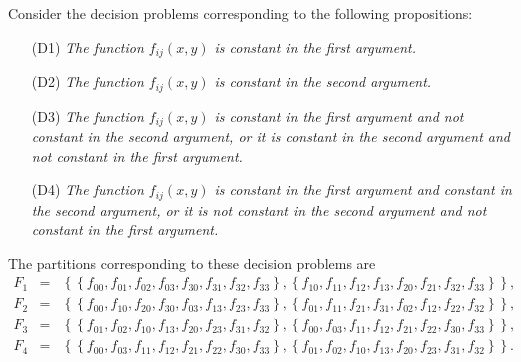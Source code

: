 Consider the decision problems corresponding to the following propositions:
\begin{enumerate}
\item[(D1)]
{\em The function $f_{ij}(x,y)$  is  constant in the first argument.}


\item[(D2)]
{\em The function $f_{ij}(x,y)$  is  constant in the second argument.}


\item[(D3)]
{\em The function $f_{ij}(x,y)$  is  constant in the first argument and not constant in the second argument,
                           or it is  constant in the second argument and not constant in the first argument.}


\item[(D4)]
{\em The function $f_{ij}(x,y)$  is  constant in the first argument and constant in the second argument,
                           or it is  not constant in the second argument and not constant in the first argument.}
\end{enumerate}

The partitions corresponding to these decision problems are
\begin{eqnarray}
F_1&=&
\left\{
\left\{
     f_{ 00} ,
     f_{ 01} ,
     f_{ 02} ,
     f_{ 03} ,
     f_{ 30} ,
     f_{ 31} ,
     f_{ 32} ,
     f_{ 33}
\right\},
\left\{
    f_{  10} ,
     f_{ 11} ,
     f_{ 12} ,
     f_{ 13} ,
     f_{ 20} ,
     f_{ 21} ,
     f_{ 32} ,
     f_{ 33}
\right\}
\right\}
,
\label{2005-ko-e55-01a}   \\
F_2&=&
\left\{
\left\{
     f_{ 00} ,
     f_{ 10} ,
     f_{ 20} ,
     f_{ 30} ,
     f_{ 03} ,
     f_{ 13} ,
     f_{ 23} ,
     f_{ 33}
\right\},
\left\{
     f_{ 01} ,
     f_{ 11} ,
     f_{ 21} ,
     f_{ 31} ,
     f_{ 02} ,
     f_{ 12} ,
     f_{ 22} ,
     f_{ 32}
\right\}
\right\}
,
\label{2005-ko-e55-01b}   \\
F_3&=&
\left\{
\left\{
     f_{ 01} ,
     f_{ 02} ,
     f_{ 10} ,
     f_{ 13} ,
     f_{ 20} ,
     f_{ 23} ,
     f_{ 31} ,
     f_{ 32}
\right\},
\left\{
     f_{ 00} ,
     f_{ 03} ,
     f_{ 11} ,
     f_{ 12} ,
     f_{ 21} ,
     f_{ 22} ,
     f_{ 30} ,
     f_{ 33}
\right\}
\right\}
,
\label{2005-ko-e55-01c}   \\
F_4&=&
\left\{
\left\{
     f_{ 00} ,
     f_{ 03} ,
     f_{ 11} ,
     f_{ 12} ,
     f_{ 21} ,
     f_{ 22} ,
     f_{ 30} ,
     f_{ 33}
\right\},
\left\{
     f_{ 01} ,
     f_{ 02} ,
     f_{ 10} ,
     f_{ 13} ,
     f_{ 20} ,
     f_{ 23} ,
     f_{ 31} ,
     f_{ 32}
\right\}
\right\}
.
\label{2005-ko-e55-01d}
\end{eqnarray}

